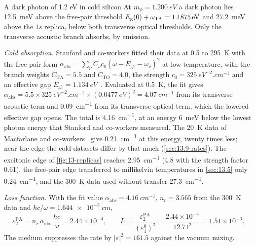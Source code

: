 \begin{workedexample}{A dark photon of 1.2 eV in cold silicon}\label{we:13-darkphoton-edge}
At $m_\phi = \SI{1.200}{eV}$ a dark photon lies \SI{12.5}{meV} above the free-pair threshold $E_{\mathrm{g}}(0) + \omega_{\mathrm{TA}} = \SI{1.1875}{eV}$ and \SI{27.2}{meV} above the $1s$ replica, below both transverse optical thresholds. Only the transverse acoustic branch absorbs, by emission.

\emph{Cold absorption.} Stanford and co-workers fitted their data at 0.5 to \SI{295}{K} with the free-pair form $\alpha_{\mathrm{abs}} = \sum_\nu C_\nu c_0(\omega - E_{\mathrm{g}1} - \omega_\nu)^2$ at low temperature, with the branch weights $C_{\mathrm{TA}} = 5.5$ and $C_{\mathrm{TO}} = 4.0$, the strength $c_0 = \SI{325}{eV^{-2}.cm^{-1}}$ and an effective gap $E_{\mathrm{g}1} = \SI{1.134}{eV}$~\cite[Eqs.~(4)--(7)]{stanford2021photoelectric}. Evaluated at \SI{0.5}{K}, the fit gives $\alpha_{\mathrm{abs}} = 5.5\times\SI{325}{eV^{-2}.cm^{-1}}\times(\SI{0.0477}{eV})^2 = \SI{4.07}{cm^{-1}}$ from its transverse acoustic term and \SI{0.09}{cm^{-1}} from its transverse optical term, which the lowered effective gap opens. The total is \SI{4.16}{cm^{-1}}, at an energy \SI{6}{meV} below the lowest photon energy that Stanford and co-workers measured. The \SI{20}{K} data of Macfarlane and co-workers~\cite{macfarlane1958fine} give \SI{0.21}{cm^{-1}} at this energy, twenty times less; near the edge the cold datasets differ by that much (\cref{sec:13.9-rates}). The excitonic edge of \cref{fig:13-replicas} reaches \SI{2.95}{cm^{-1}} (4.8 with the strength factor 0.61), the free-pair edge transferred to millikelvin temperatures in \cref{sec:13.5} only \SI{0.24}{cm^{-1}}, and the \SI{300}{K} data used without transfer \SI{27.3}{cm^{-1}}.

\emph{Loss function.} With the fit value $\alpha_{\mathrm{abs}} = \SI{4.16}{cm^{-1}}$, $n_r = 3.565$ from the \SI{300}{K} data and $\hbar c/\omega = \SI{1.644e-5}{cm}$,
\begin{equation*}
  \varepsilon_2^{\mathrm{PA}} = n_r\,\alpha_{\mathrm{abs}}\,\frac{\hbar c}{\omega} = 2.44\times10^{-4} , \qquad
  L = \frac{\varepsilon_2^{\mathrm{PA}}}{(\varepsilon_1^0)^2} = \frac{2.44\times10^{-4}}{12.71^2} = 1.51\times10^{-6} .
\end{equation*}
The medium suppresses the rate by $|\varepsilon|^2 = 161.5$ against the vacuum mixing.


\end{workedexample}
